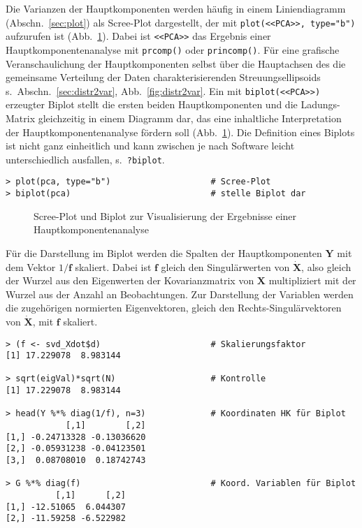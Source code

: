 Die Varianzen der Hauptkomponenten werden häufig in einem Liniendiagramm (Abschn.\ \ref{sec:plot}) als Scree-Plot dargestellt, der mit \lstinline!plot(<<PCA>>, type="b")! aufzurufen ist (Abb.\ \ref{fig:pcaScreeBiplot}). Dabei ist \lstinline!<<PCA>>! das Ergebnis einer Hauptkomponentenanalyse mit \lstinline!prcomp()! oder \lstinline!princomp()!. Für eine grafische Veranschaulichung der Hauptkomponenten selbst über die Hauptachsen des die gemeinsame Verteilung der Daten charakterisierenden Streuungsellipsoids s.\ Abschn.\ \ref{sec:distr2var}, Abb.\ \ref{fig:distr2var}. Ein mit \lstinline!biplot(<<PCA>>)!  erzeugter Biplot stellt die ersten beiden Hauptkomponenten und die Ladungs-Matrix gleichzeitig in einem Diagramm dar, das eine inhaltliche Interpretation der Hauptkomponentenanalyse fördern soll (Abb.\ \ref{fig:pcaScreeBiplot}). Die Definition eines Biplots ist nicht ganz einheitlich und kann zwischen je nach Software leicht unterschiedlich ausfallen, s.\ \lstinline!?biplot!.
\begin{lstlisting}
> plot(pca, type="b")                    # Scree-Plot
> biplot(pca)                            # stelle Biplot dar
\end{lstlisting}

\begin{figure}[ht]
\centering
\vspace*{-0.5em}
\caption{Scree-Plot und Biplot zur Visualisierung der Ergebnisse einer Hauptkomponentenanalyse}
\label{fig:pcaScreeBiplot}
\end{figure}
     
Für die Darstellung im Biplot werden die Spalten der Hauptkomponenten $\bm{Y}$ mit dem Vektor $1/\bm{f}$ skaliert. Dabei ist $\bm{f}$ gleich den Singulärwerten von $\dot{\bm{X}}$, also gleich der Wurzel aus den Eigenwerten der Kovarianzmatrix von $\bm{X}$ multipliziert mit der Wurzel aus der Anzahl an Beobachtungen. Zur Darstellung der Variablen werden die zugehörigen normierten Eigenvektoren, gleich den Rechts-Singulärvektoren von $\dot{\bm{X}}$, mit $\bm{f}$ skaliert.
\begin{lstlisting}
> (f <- svd_Xdot$d)                      # Skalierungsfaktor
[1] 17.229078  8.983144

> sqrt(eigVal)*sqrt(N)                   # Kontrolle
[1] 17.229078  8.983144

> head(Y %*% diag(1/f), n=3)             # Koordinaten HK für Biplot
            [,1]        [,2]
[1,] -0.24713328 -0.13036620
[2,] -0.05931238 -0.04123501
[3,]  0.08708010  0.18742743

> G %*% diag(f)                          # Koord. Variablen für Biplot 
          [,1]      [,2]
[1,] -12.51065  6.044307
[2,] -11.59258 -6.522982
\end{lstlisting}
     
